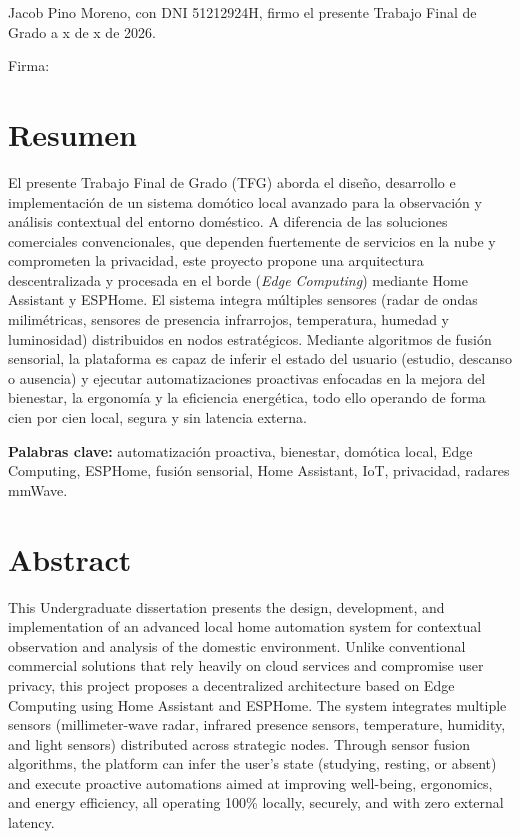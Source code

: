 \documentclass[a4paper, 12pt]{article}
\begin{document}
\setlength{\parskip}{5mm} %


\clearpage

\thispagestyle{empty}
\vspace*{5cm}
\noindent Jacob Pino Moreno, con DNI 51212924H, firmo el presente Trabajo Final de Grado a x de x de 2026.

\vspace{2cm}
\noindent Firma:
\clearpage

\thispagestyle{empty}
\section*{Resumen}
El presente Trabajo Final de Grado (TFG) aborda el diseño, desarrollo e implementación de un sistema domótico local avanzado para la observación y análisis contextual del entorno doméstico. A diferencia de las soluciones comerciales convencionales, que dependen fuertemente de servicios en la nube y comprometen la privacidad, este proyecto propone una arquitectura descentralizada y procesada en el borde (\textit{Edge Computing}) mediante Home Assistant y ESPHome. El sistema integra múltiples sensores (radar de ondas milimétricas, sensores de presencia infrarrojos, temperatura, humedad y luminosidad) distribuidos en nodos estratégicos. Mediante algoritmos de fusión sensorial, la plataforma es capaz de inferir el estado del usuario (estudio, descanso o ausencia) y ejecutar automatizaciones proactivas enfocadas en la mejora del bienestar, la ergonomía y la eficiencia energética, todo ello operando de forma cien por cien local, segura y sin latencia externa.

\vspace{1cm}
\noindent \textbf{Palabras clave:} automatización proactiva, bienestar, domótica local, Edge Computing, ESPHome, fusión sensorial, Home Assistant, IoT, privacidad, radares mmWave.
\clearpage

\thispagestyle{empty}
\section*{Abstract}
This Undergraduate dissertation presents the design, development, and implementation of an advanced local home automation system for contextual observation and analysis of the domestic environment. Unlike conventional commercial solutions that rely heavily on cloud services and compromise user privacy, this project proposes a decentralized architecture based on Edge Computing using Home Assistant and ESPHome. The system integrates multiple sensors (millimeter-wave radar, infrared presence sensors, temperature, humidity, and light sensors) distributed across strategic nodes. Through sensor fusion algorithms, the platform can infer the user's state (studying, resting, or absent) and execute proactive automations aimed at improving well-being, ergonomics, and energy efficiency, all operating 100\% locally, securely, and with zero external latency.
\end{document}
